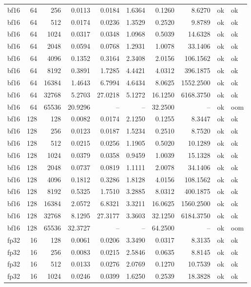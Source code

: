 \begin{tabular}{lrrrrrrrll}
bf16 & 64 & 256 & 0.0113 & 0.0184 & 1.6364 & 0.1260 & 8.6270 & ok & ok \\
bf16 & 64 & 512 & 0.0174 & 0.0236 & 1.3529 & 0.2520 & 9.8789 & ok & ok \\
bf16 & 64 & 1024 & 0.0317 & 0.0348 & 1.0968 & 0.5039 & 14.6328 & ok & ok \\
bf16 & 64 & 2048 & 0.0594 & 0.0768 & 1.2931 & 1.0078 & 33.1406 & ok & ok \\
bf16 & 64 & 4096 & 0.1352 & 0.3164 & 2.3408 & 2.0156 & 106.1562 & ok & ok \\
bf16 & 64 & 8192 & 0.3891 & 1.7285 & 4.4421 & 4.0312 & 396.1875 & ok & ok \\
bf16 & 64 & 16384 & 1.4643 & 6.7994 & 4.6434 & 8.0625 & 1552.2500 & ok & ok \\
bf16 & 64 & 32768 & 5.2703 & 27.0218 & 5.1272 & 16.1250 & 6168.3750 & ok & ok \\
bf16 & 64 & 65536 & 20.9296 & -- & -- & 32.2500 & -- & ok & oom \\
bf16 & 128 & 128 & 0.0082 & 0.0174 & 2.1250 & 0.1255 & 8.3447 & ok & ok \\
bf16 & 128 & 256 & 0.0123 & 0.0187 & 1.5234 & 0.2510 & 8.7520 & ok & ok \\
bf16 & 128 & 512 & 0.0215 & 0.0256 & 1.1905 & 0.5020 & 10.1289 & ok & ok \\
bf16 & 128 & 1024 & 0.0379 & 0.0358 & 0.9459 & 1.0039 & 15.1328 & ok & ok \\
bf16 & 128 & 2048 & 0.0737 & 0.0819 & 1.1111 & 2.0078 & 34.1406 & ok & ok \\
bf16 & 128 & 4096 & 0.1812 & 0.3286 & 1.8128 & 4.0156 & 108.1562 & ok & ok \\
bf16 & 128 & 8192 & 0.5325 & 1.7510 & 3.2885 & 8.0312 & 400.1875 & ok & ok \\
bf16 & 128 & 16384 & 2.0572 & 6.8321 & 3.3211 & 16.0625 & 1560.2500 & ok & ok \\
bf16 & 128 & 32768 & 8.1295 & 27.3177 & 3.3603 & 32.1250 & 6184.3750 & ok & ok \\
bf16 & 128 & 65536 & 32.3727 & -- & -- & 64.2500 & -- & ok & oom \\
fp32 & 16 & 128 & 0.0061 & 0.0206 & 3.3490 & 0.0317 & 8.3135 & ok & ok \\
fp32 & 16 & 256 & 0.0083 & 0.0215 & 2.5846 & 0.0635 & 8.8145 & ok & ok \\
fp32 & 16 & 512 & 0.0133 & 0.0276 & 2.0769 & 0.1270 & 10.7539 & ok & ok \\
fp32 & 16 & 1024 & 0.0246 & 0.0399 & 1.6250 & 0.2539 & 18.3828 & ok & ok \\

\end{tabular}
